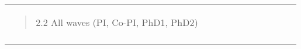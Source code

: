 \begin{longtable}[]{@{}lllllllllll@{}}
\begin{minipage}[t]{0.07\columnwidth}
\begin{quote}
2.2 All waves (PI, Co-PI, PhD1, PhD2) \end{quote}\strut \end{minipage} & \begin{minipage}[t]{0.07\columnwidth}\raggedright \strut \end{minipage} & \begin{minipage}[t]{0.07\columnwidth}\raggedright \strut \end{minipage} & \begin{minipage}[t]{0.07\columnwidth}\raggedright \strut \end{minipage} & \begin{minipage}[t]{0.07\columnwidth}\raggedright \strut \end{minipage} & \begin{minipage}[t]{0.07\columnwidth}\raggedright \strut \end{minipage} & \begin{minipage}[t]{0.07\columnwidth}\raggedright \strut \end{minipage} & \begin{minipage}[t]{0.07\columnwidth}\raggedright \strut \end{minipage} & \begin{minipage}[t]{0.07\columnwidth}\raggedright \strut \end{minipage} & \begin{minipage}[t]{0.07\columnwidth}\raggedright \strut \end{minipage} & \begin{minipage}[t]{0.07\columnwidth}\raggedright \strut \end{minipage}\tabularnewline \begin{minipage}[t]{0.07\columnwidth}\raggedright \strut \end{minipage} & \begin{minipage}[t]{0.07\columnwidth}\raggedright \strut \end{minipage} & \begin{minipage}[t]{0.07\columnwidth}\raggedright \strut \end{minipage} & \begin{minipage}[t]{0.07\columnwidth}\raggedright \strut \end{minipage} & \begin{minipage}[t]{0.07\columnwidth}\raggedright \strut \end{minipage} & \begin{minipage}[t]{0.07\columnwidth}\raggedright \strut \end{minipage} & \begin{minipage}[t]{0.07\columnwidth}\raggedright \strut \end{minipage} & \begin{minipage}[t]{0.07\columnwidth}\raggedright \strut \end{minipage} & \begin{minipage}[t]{0.07\columnwidth}\raggedright \strut \end{minipage} & 
\end{quote}
\end{minipage}
\end{longtable}

